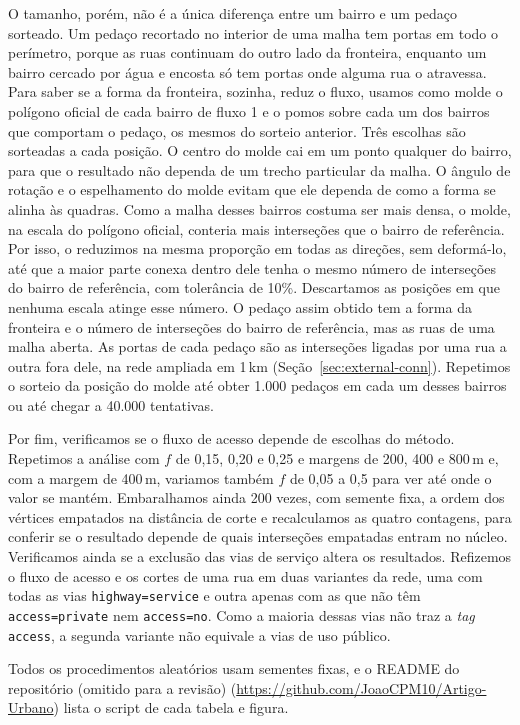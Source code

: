 O tamanho, porém, não é a única diferença entre um bairro e um pedaço sorteado.
Um pedaço recortado no interior de uma malha tem portas em todo o perímetro,
porque as ruas continuam do outro lado da fronteira, enquanto um bairro cercado
por água e encosta só tem portas onde alguma rua o atravessa. Para saber se a
forma da fronteira, sozinha, reduz o fluxo, usamos como molde o polígono
oficial de cada bairro de fluxo 1 e o pomos sobre cada um dos bairros que
comportam o pedaço, os mesmos do sorteio anterior. Três escolhas são sorteadas
a cada posição. O centro do molde cai em um ponto qualquer do bairro, para que
o resultado não dependa de um trecho particular da malha. O ângulo de rotação e
o espelhamento do molde evitam que ele dependa de como a forma se alinha às
quadras. Como a malha desses bairros costuma ser mais densa, o molde, na escala do polígono oficial, 
conteria mais interseções que o bairro de referência. Por isso, o
reduzimos na mesma proporção em todas as direções, sem deformá-lo, até que a
maior parte conexa dentro dele tenha o mesmo número de interseções do bairro de
referência, com tolerância de 10\%. Descartamos as posições em que nenhuma
escala atinge esse número. O pedaço assim obtido tem a forma da fronteira e o
número de interseções do bairro de referência, mas as ruas de uma malha aberta.
As portas de cada pedaço são as interseções ligadas por uma rua a outra fora
dele, na rede ampliada em 1\,km (Seção~\ref{sec:external-conn}). Repetimos o
sorteio da posição do molde até obter 1.000 pedaços em cada um desses bairros
ou até chegar a 40.000 tentativas.

Por fim, verificamos se o fluxo de acesso depende de escolhas do método.
Repetimos a análise com $f$ de 0,15, 0,20 e 0,25 e margens de 200, 400 e
800\,m e, com a margem de 400\,m, variamos também $f$ de 0,05 a 0,5 para ver
até onde o valor se mantém. Embaralhamos ainda 200 vezes, com semente fixa, a
ordem dos vértices empatados na distância de corte e recalculamos as quatro
contagens, para conferir se o resultado depende de quais interseções empatadas
entram no núcleo. Verificamos ainda se a exclusão das vias de serviço altera
os resultados. Refizemos o fluxo de acesso e os cortes de uma rua em duas
variantes da rede, uma com todas as vias \texttt{highway=service} e outra
apenas com as que não têm \texttt{access=private} nem \texttt{access=no}. Como
a maioria dessas vias não traz a \emph{tag} \texttt{access}, a segunda
variante não equivale a vias de uso público.

Todos os procedimentos aleatórios usam sementes fixas, e o README do
repositório \ifcego (omitido para a revisão)\else
(\url{https://github.com/JoaoCPM10/Artigo-Urbano})\fi{} lista o script de cada
tabela e figura.

